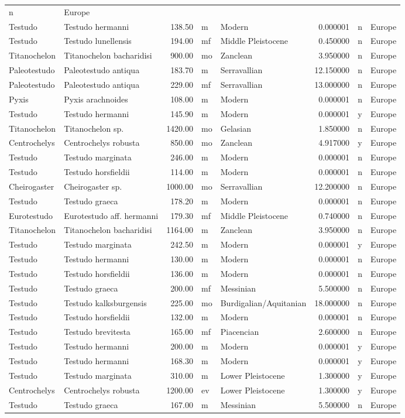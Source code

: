 \documentclass[]{article}
\begin{document}
\begin{longtable}[]{@{}llrllrll@{}}
n & Europe\tabularnewline
Testudo & Testudo hermanni & 138.50 & m & Modern & 0.000001 & n &
Europe\tabularnewline
Testudo & Testudo lunellensis & 194.00 & mf & Middle Pleistocene &
0.450000 & n & Europe\tabularnewline
Titanochelon & Titanochelon bacharidisi & 900.00 & mo & Zanclean &
3.950000 & n & Europe\tabularnewline
Paleotestudo & Paleotestudo antiqua & 183.70 & m & Serravallian &
12.150000 & n & Europe\tabularnewline
Paleotestudo & Paleotestudo antiqua & 229.00 & mf & Serravallian &
13.000000 & n & Europe\tabularnewline
Pyxis & Pyxis arachnoides & 108.00 & m & Modern & 0.000001 & n &
Europe\tabularnewline
Testudo & Testudo hermanni & 145.90 & m & Modern & 0.000001 & y &
Europe\tabularnewline
Titanochelon & Titanochelon sp. & 1420.00 & mo & Gelasian & 1.850000 & n
& Europe\tabularnewline
Centrochelys & Centrochelys robusta & 850.00 & mo & Zanclean & 4.917000
& y & Europe\tabularnewline
Testudo & Testudo marginata & 246.00 & m & Modern & 0.000001 & n &
Europe\tabularnewline
Testudo & Testudo horsfieldii & 114.00 & m & Modern & 0.000001 & n &
Europe\tabularnewline
Cheirogaster & Cheirogaster sp. & 1000.00 & mo & Serravallian &
12.200000 & n & Europe\tabularnewline
Testudo & Testudo graeca & 178.20 & m & Modern & 0.000001 & n &
Europe\tabularnewline
Eurotestudo & Eurotestudo aff. hermanni & 179.30 & mf & Middle
Pleistocene & 0.740000 & n & Europe\tabularnewline
Titanochelon & Titanochelon bacharidisi & 1164.00 & m & Zanclean &
3.950000 & n & Europe\tabularnewline
Testudo & Testudo marginata & 242.50 & m & Modern & 0.000001 & y &
Europe\tabularnewline
Testudo & Testudo hermanni & 130.00 & m & Modern & 0.000001 & n &
Europe\tabularnewline
Testudo & Testudo horsfieldii & 136.00 & m & Modern & 0.000001 & n &
Europe\tabularnewline
Testudo & Testudo graeca & 200.00 & mf & Messinian & 5.500000 & n &
Europe\tabularnewline
Testudo & Testudo kalksburgensis & 225.00 & mo & Burdigalian/Aquitanian
& 18.000000 & n & Europe\tabularnewline
Testudo & Testudo horsfieldii & 132.00 & m & Modern & 0.000001 & n &
Europe\tabularnewline
Testudo & Testudo brevitesta & 165.00 & mf & Piacencian & 2.600000 & n &
Europe\tabularnewline
Testudo & Testudo hermanni & 200.00 & m & Modern & 0.000001 & y &
Europe\tabularnewline
Testudo & Testudo hermanni & 168.30 & m & Modern & 0.000001 & y &
Europe\tabularnewline
Testudo & Testudo marginata & 310.00 & m & Lower Pleistocene & 1.300000
& y & Europe\tabularnewline
Centrochelys & Centrochelys robusta & 1200.00 & ev & Lower Pleistocene &
1.300000 & y & Europe\tabularnewline
Testudo & Testudo graeca & 167.00 & m & Messinian & 5.500000 & n &
Europe\tabularnewline

\end{longtable}
\end{document}
